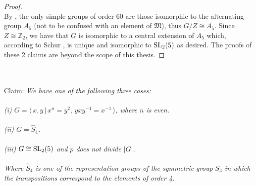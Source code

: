 \begin{proof}
\\
By \cite[p.145]{dummit}, the only simple groups of order 60 are those isomorphic to the alternating group $A_5$ (not to be confused with an element of $\mathfrak{M}$), thus $G / Z \cong A_5$. Since $Z \cong \mathbb{Z}_2$, we have that $G$ is isomorphic to a central extension of $A_5$ which, according to Schur \cite{schur}, is unique and isomorphic to $\operatorname{SL}_2(5)$ as desired. The proofs of these 2 claims are beyond the scope of this thesis. \qedhere

\end{proof}

\begin{theorem}[Case VI]\\
\\
Claim: \textit{We have one of the following three cases: \\
\\
(i) $G = \langle \, x,y \, | \, x^n = y^2, \, yxy^{-1} = x^{-1} \, \rangle$, where $n$ is even. \\
\\
(ii) $G = \widehat{S}_4$. \\
\\
(iii) $G \cong \operatorname{SL}_2(5)$ and $p$ does not divide $|G|$. \\
\\
Where $\widehat{S}_4$ is one of the representation groups of the symmetric group $S_4$ in which the transpositions correspond to the elements of order 4.} \\

\end{theorem}

